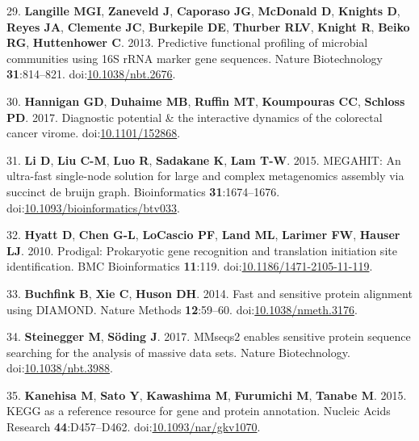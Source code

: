 \documentclass[11pt,]{article}
\begin{document}
\hypertarget{ref-Langille2013}{}
29. \textbf{Langille MGI}, \textbf{Zaneveld J}, \textbf{Caporaso JG},
\textbf{McDonald D}, \textbf{Knights D}, \textbf{Reyes JA},
\textbf{Clemente JC}, \textbf{Burkepile DE}, \textbf{Thurber RLV},
\textbf{Knight R}, \textbf{Beiko RG}, \textbf{Huttenhower C}. 2013.
Predictive functional profiling of microbial communities using 16S rRNA
marker gene sequences. Nature Biotechnology \textbf{31}:814--821.
doi:\href{https://doi.org/10.1038/nbt.2676}{10.1038/nbt.2676}.

\hypertarget{ref-Hannigan2017}{}
30. \textbf{Hannigan GD}, \textbf{Duhaime MB}, \textbf{Ruffin MT},
\textbf{Koumpouras CC}, \textbf{Schloss PD}. 2017. Diagnostic potential
\& the interactive dynamics of the colorectal cancer virome.
doi:\href{https://doi.org/10.1101/152868}{10.1101/152868}.

\hypertarget{ref-Li2015}{}
31. \textbf{Li D}, \textbf{Liu C-M}, \textbf{Luo R}, \textbf{Sadakane
K}, \textbf{Lam T-W}. 2015. MEGAHIT: An ultra-fast single-node solution
for large and complex metagenomics assembly via succinct de bruijn
graph. Bioinformatics \textbf{31}:1674--1676.
doi:\href{https://doi.org/10.1093/bioinformatics/btv033}{10.1093/bioinformatics/btv033}.

\hypertarget{ref-Hyatt2010}{}
32. \textbf{Hyatt D}, \textbf{Chen G-L}, \textbf{LoCascio PF},
\textbf{Land ML}, \textbf{Larimer FW}, \textbf{Hauser LJ}. 2010.
Prodigal: Prokaryotic gene recognition and translation initiation site
identification. BMC Bioinformatics \textbf{11}:119.
doi:\href{https://doi.org/10.1186/1471-2105-11-119}{10.1186/1471-2105-11-119}.

\hypertarget{ref-Buchfink2014}{}
33. \textbf{Buchfink B}, \textbf{Xie C}, \textbf{Huson DH}. 2014. Fast
and sensitive protein alignment using DIAMOND. Nature Methods
\textbf{12}:59--60.
doi:\href{https://doi.org/10.1038/nmeth.3176}{10.1038/nmeth.3176}.

\hypertarget{ref-Steinegger2017}{}
34. \textbf{Steinegger M}, \textbf{Söding J}. 2017. MMseqs2 enables
sensitive protein sequence searching for the analysis of massive data
sets. Nature Biotechnology.
doi:\href{https://doi.org/10.1038/nbt.3988}{10.1038/nbt.3988}.

\hypertarget{ref-Kanehisa2015}{}
35. \textbf{Kanehisa M}, \textbf{Sato Y}, \textbf{Kawashima M},
\textbf{Furumichi M}, \textbf{Tanabe M}. 2015. KEGG as a reference
resource for gene and protein annotation. Nucleic Acids Research
\textbf{44}:D457--D462.
doi:\href{https://doi.org/10.1093/nar/gkv1070}{10.1093/nar/gkv1070}.
\end{document}

